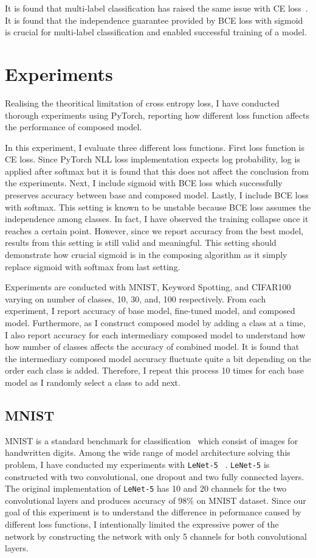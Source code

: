 \documentclass{article}
\begin{document}
It is found that multi-label classification has raised the same issue with CE loss~\cite{liu2017deep}. It is found that the independence guarantee provided by BCE loss with sigmoid is crucial for multi-label classification and enabled successful training of a model.

\section{Experiments}

Realising the theoritical limitation of cross entropy loss, I have conducted thorough experiments using PyTorch, reporting how different loss function affects the performance of composed model.

In this experiment, I evaluate three different loss functions. First loss function is CE loss. Since PyTorch NLL loss implementation expects log probability, log is applied after softmax but it is found that this does not affect the conclusion from the experiments. Next, I include sigmoid with BCE loss which successfully preserves accuracy between base and composed model. Lastly, I include BCE loss with softmax. This setting is known to be unstable because BCE loss assumes the independence among classes. In fact, I have observed the training collapse once it reaches a certain point. However, since we report accuracy from the best model, results from this setting is still valid and meaningful. This setting should demonstrate how crucial sigmoid is in the composing algorithm as it simply replace sigmoid with softmax from last setting.

Experiments are conducted with MNIST, Keyword Spotting, and CIFAR100 varying on number of classes, 10, 30, and, 100 respectively. From each experiment, I report accuracy of base model, fine-tuned model, and composed model. Furthermore, as I construct composed model by adding a class at a time, I also report accuracy for each intermediary composed model to understand how how number of classes affects the accuracy of combined model. It is found that the intermediary composed model accuracy fluctuate quite a bit depending on the order each class is added. Therefore, I repeat this process 10 times for each base model as I randomly select a class to add next.

\subsection{MNIST}

MNIST is a standard benchmark for classification~\cite{lecun1998gradient} which consist of images for handwritten digits. Among the wide range of model architecture solving this problem, I have conducted my experiments with \texttt{LeNet-5} ~\cite{lecun2015lenet}. \texttt{LeNet-5} is constructed with two convolutional, one dropout and two fully connected layers. The original implementation of \texttt{LeNet-5} has 10 and 20 channels for the two convolutional layers and produces accuracy of 98\% on MNIST dataset. Since our goal of this experiment is to understand the difference in peformance caused by different loss functions, I intentionally limited the expressive power of the network by constructing the network with only 5 channels for both convolutional layers.
\end{document}
